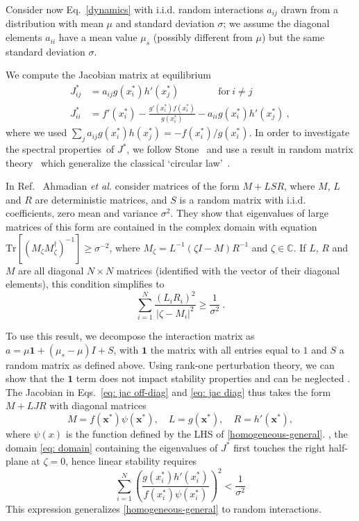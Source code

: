 
Consider now Eq.~\eqref{dynamics} with i.i.d. random interactions $a_{ij}$ drawn from a distribution with mean $\mu$ and standard deviation $\sigma$; we assume the diagonal elements $a_{ii}$ have a mean value $\mu_s$ (possibly different from $\mu$) but the same standard deviation $\sigma$.
 
We compute the Jacobian matrix at equilibrium
\begin{align}
    J_{ij}^* & = a_{ij}g(x_i^*)h'(x_j^*) \qquad \qquad \textrm{for} \ i\neq j \label{eq: jac off-diag}\\
    J_{ii}^* & = f'(x_i^*) - \frac{g'(x_i^*)f(x_i^*)}{g(x_i^*)} - a_{ii}g(x_i^*)h'(x_j^*) \ , \label{eq: jac diag}
\end{align}
where we used $\sum_{j}a_{ij}g(x_i^*)h(x_j^*)=-f(x_i^*)/g(x_i^*)$.
In order to investigate the spectral properties of $J^*$, 
we follow Stone~\cite{Stone2018} and use a result in random matrix theory~\cite{Ahmadian2015} which generalize the classical `circular law'~\cite{Potters2020}.

In Ref.~\cite{Ahmadian2015} Ahmadian \emph{et al.} consider matrices of the form $M + LSR$, where $M$,  
$L$ and $R$ are deterministic matrices, and $S$ is a random matrix with i.i.d. coefficients, zero mean and variance $\sigma^2$.
They show that eigenvalues of large matrices of this form are contained in the complex domain with equation
$\textrm{Tr}[(M_\zeta M_\zeta^\dagger)^{-1}]\geq \sigma^{-2}$, where $M_\zeta = L^{-1}(\zeta I - M)R^{-1}$ and $\zeta\in\mathbb{C}$.
If $L$, $R$ and $M$ are all diagonal $N\times N$ matrices (identified with the vector of their diagonal elements), this condition simplifies to
\begin{equation}
    \sum_{i=1}^N\frac{(L_{i}R_{i})^2}{ \vert \zeta - M_{i}\vert^2 }\geq \frac{1}{\sigma^{2}} \ .
\label{eq: domain}
\end{equation}

To use this result, we decompose the interaction matrix as $a = \mu \mathbf{1} + (\mu_s-\mu)I + S$,
with $\mathbf{1}$ the matrix with all entries equal to $1$ and $S$ a random matrix as defined above.
Using rank-one perturbation theory, we can show that the $\mathbf{1}$ term does not impact stability properties and can be neglected \cite{Stone2018}.
The Jacobian in Eqs.~\eqref{eq: jac off-diag} and \eqref{eq: jac diag} thus takes the form $M + LJR$ with diagonal matrices
\begin{equation}
    M = f(\mathbf x^*)\psi(\mathbf x^*),\quad L = g(\mathbf x^*), \quad R = h'(\mathbf x^*),
\end{equation}
where $\psi(x)$ is the function defined by the LHS of \eqref{homogeneous-general}. , the domain \eqref{eq: domain} containing the eigenvalues of $J^*$ first touches the right half-plane at $\zeta = 0$, 
hence linear stability requires
\begin{equation}
    \sum_{i=1}^N \left(\frac{g(x_i^*)h'(x_i^*)}{f(x_i^*)\psi(x_i^*)}\right)^2
    < \frac{1}{\sigma^{2}}
    \label{eq: random-stability}
\end{equation}
This expression generalizes \eqref{homogeneous-general} to random interactions. 

